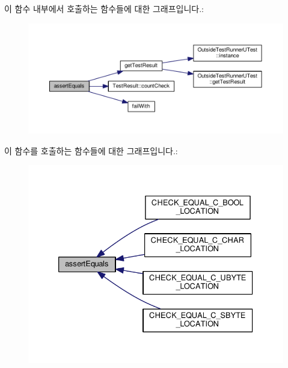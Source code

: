 이 함수 내부에서 호출하는 함수들에 대한 그래프입니다.\+:
\nopagebreak
\begin{figure}[H]
\begin{center}
\leavevmode
\includegraphics[width=350pt]{class_utest_shell_aeecd2ef3112bdf517a53d945cf0a818d_cgraph}
\end{center}
\end{figure}




이 함수를 호출하는 함수들에 대한 그래프입니다.\+:
\nopagebreak
\begin{figure}[H]
\begin{center}
\leavevmode
\includegraphics[width=333pt]{class_utest_shell_aeecd2ef3112bdf517a53d945cf0a818d_icgraph}
\end{center}
\end{figure}


